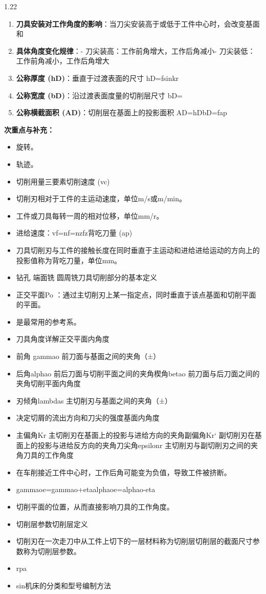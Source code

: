 \documentclass[12pt,a4paper]{article}
\begin{document}
\begin{spacing}{1.22}
\begin{tcolorbox}[colback=yellow!6,colframe=red!55!black,title=重点,left=1mm,right=1mm]
\begin{enumerate}[leftmargin=2.2em,label=\arabic*.]
  \item \textbf{刀具安装对工作角度的影响}：当刀尖安装高于或低于工件中心时，会改变基面和
  \item \textbf{具体角度变化规律}：- 刀尖装高：工作前角增大，工作后角减小- 刀尖装低：工作前角减小，工作后角增大
  \item \textbf{公称厚度 (hD)}：垂直于过渡表面的尺寸 hD=fsinkr
  \item \textbf{公称宽度 (bD)}：沿过渡表面度量的切削层尺寸 bD=
  \item \textbf{公称横截面积 (AD)}：切削层在基面上的投影面积 AD=hDbD=fap
\end{enumerate}
\end{tcolorbox}
\noindent\textbf{次重点与补充：}
\begin{itemize}[leftmargin=2.2em,label=--]
  \item 旋转。
  \item 轨迹。
  \item 切削用量三要素切削速度 (vc)
  \item 切削刃相对于工件的主运动速度，单位m/s或m/min。
  \item 工件或刀具每转一周的相对位移，单位mm/r。
  \item 进给速度：vf=nf=nzfz背吃刀量 (ap)
  \item 刀具切削刃与工件的接触长度在同时垂直于主运动和进给进给运动的方向上的投影值称为背吃刀量，单位mm。
  \item 钻孔 端面铣 圆周铣刀具切削部分的基本定义
  \item 正交平面Po ：通过主切削刃上某一指定点，同时垂直于该点基面和切削平面的平面。
  \item 是最常用的参考系。
  \item 刀具角度详解正交平面内角度
  \item 前角 gammao 前刀面与基面之间的夹角（±）
  \item 后角alphao 前后刀面与切削平面之间的夹角楔角betao 前刀面与后刀面之间的夹角切削平面内角度
  \item 刃倾角lambdas 主切削刃与基面之间的夹角（±）
  \item 决定切屑的流出方向和刀尖的强度基面内角度
  \item 主偏角Kr 主切削刃在基面上的投影与进给方向的夹角副偏角Kr‘ 副切削刃在基面上的投影与进给反方向的夹角刀尖角epsilonr 主切削刃与副切削刃之间的夹角刀具的工作角度
  \item 在车削接近工件中心时，工作后角可能变为负值，导致工件被挤断。
  \item gammaoe=gammao+etaalphaoe=alphao-eta
  \item 切削平面的位置，从而直接影响刀具的工作角度。
  \item 切削层参数切削层定义
  \item 切削刃在一次走刀中从工件上切下的一层材料称为切削层切削层的截面尺寸参数称为切削层参数。
  \item rpa
  \item sin机床的分类和型号编制方法
\end{itemize}


\end{spacing}
\end{document}

